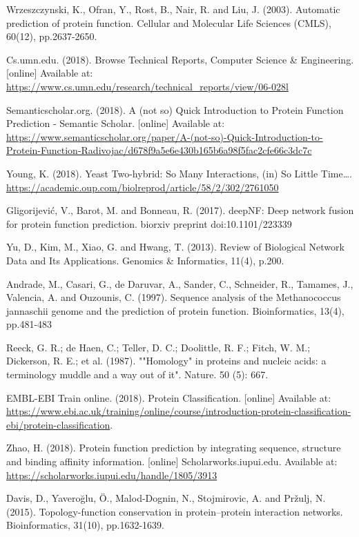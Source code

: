 \documentclass[9pt]{article}
\begin{document}
{\begin{thebibliography}{8}
Wrzeszczynski, K., Ofran, Y., Rost, B., Nair, R. and Liu, J. (2003). Automatic prediction of protein function. Cellular and Molecular Life Sciences (CMLS), 60(12), pp.2637-2650.
 
Cs.umn.edu. (2018). Browse Technical Reports, Computer Science \& Engineering. [online] Available at: \url{https://www.cs.umn.edu/research/technical_reports/view/06-028l} 

Semanticscholar.org. (2018). A (not so) Quick Introduction to Protein Function Prediction - Semantic Scholar. [online] Available at: \url{https://www.semanticscholar.org/paper/A-(not-so)-Quick-Introduction-to-Protein-Function-Radivojac/d678f9a5e6e430b165b6a98f5fac2cfe66c3dc7c}

Young, K. (2018). Yeast Two-hybrid: So Many Interactions, (in) So Little Time….
\url{https://academic.oup.com/biolreprod/article/58/2/302/2761050}

Gligorijević, V., Barot, M. and Bonneau, R. (2017). deepNF: Deep network fusion for protein function prediction. biorxiv preprint doi:10.1101/223339

Yu, D., Kim, M., Xiao, G. and Hwang, T. (2013). Review of Biological Network Data and Its Applications. Genomics \& Informatics, 11(4), p.200.

Andrade, M., Casari, G., de Daruvar, A., Sander, C., Schneider, R., Tamames, J., Valencia, A. and Ouzounis, C. (1997). Sequence analysis of the Methanococcus jannaschii genome and the prediction of protein function. Bioinformatics, 13(4), pp.481-483

Reeck, G. R.; de Haen, C.; Teller, D. C.; Doolittle, R. F.; Fitch, W. M.; Dickerson, R. E.; et al. (1987). ""Homology" in proteins and nucleic acids: a terminology muddle and a way out of it". Nature. 50 (5): 667.

EMBL-EBI Train online. (2018). Protein Classification. [online] Available at: \url{https://www.ebi.ac.uk/training/online/course/introduction-protein-classification-ebi/protein-classification}.

Zhao, H. (2018). Protein function prediction by integrating sequence, structure and binding affinity information. [online] Scholarworks.iupui.edu. Available at: \url{https://scholarworks.iupui.edu/handle/1805/3913}

Davis, D., Yaveroğlu, Ö., Malod-Dognin, N., Stojmirovic, A. and Pržulj, N. (2015). Topology-function conservation in protein–protein interaction networks. Bioinformatics, 31(10), pp.1632-1639.


\end{thebibliography}}
\end{document}
